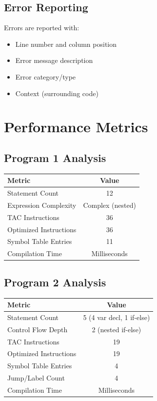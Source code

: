 \documentclass[12pt,a4paper]{report}
\begin{document}
\section{Error Reporting}

Errors are reported with:
\begin{itemize}
    \item Line number and column position
    \item Error message description
    \item Error category/type
    \item Context (surrounding code)
\end{itemize}

\chapter{Performance Metrics}

\section{Program 1 Analysis}

\begin{center}
\begin{tabular}{|l|c|}
\hline
\textbf{Metric} & \textbf{Value} \\
\hline
Statement Count & 12 \\
Expression Complexity & Complex (nested) \\
TAC Instructions & 36 \\
Optimized Instructions & 36 \\
Symbol Table Entries & 11 \\
Compilation Time & Milliseconds \\
\hline
\end{tabular}
\end{center}

\section{Program 2 Analysis}

\begin{center}
\begin{tabular}{|l|c|}
\hline
\textbf{Metric} & \textbf{Value} \\
\hline
Statement Count & 5 (4 var decl, 1 if-else) \\
Control Flow Depth & 2 (nested if-else) \\
TAC Instructions & 19 \\
Optimized Instructions & 19 \\
Symbol Table Entries & 4 \\
Jump/Label Count & 4 \\
Compilation Time & Milliseconds \\
\hline
\end{tabular}
\end{center}
\end{document}
